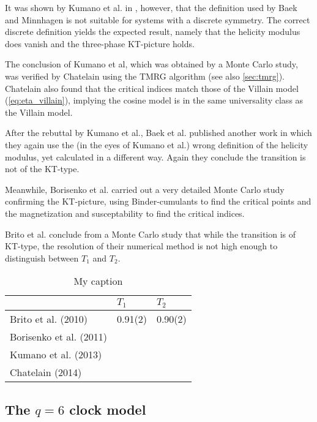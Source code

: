 It was shown by Kumano et al.
in \cite{kumano2013response}, however, that the definition used by Baek and Minnhagen is not suitable for systems with a
discrete symmetry.
The correct discrete definition yields the expected result, namely that the helicity modulus does vanish and the
three-phase KT-picture holds.

The conclusion of Kumano et al, which was obtained by a Monte Carlo study,
was verified by Chatelain \cite{chatelain2014dmrg} using the TMRG algorithm \cite{nishino1995density} (see also
\autoref{sec:tmrg}).
Chatelain also found that the critical indices match those of the Villain model (\autoref{eq:eta_villain}),
implying the cosine model is in the same universality class as the Villain model.

After the rebuttal by Kumano et al., Baek et al.
published another work \cite{baek2013residual} in which they again use the (in the eyes of Kumano et al.) wrong
definition of the helicity modulus, yet calculated in a different way.
Again they conclude the transition is not of the KT-type.

Meanwhile, Borisenko et al.
\cite{borisenko2011numerical} carried out a very detailed Monte Carlo study confirming the KT-picture,
using Binder-cumulants to find the critical points and the magnetization and susceptability to find the critical
indices.

Brito et al.
\cite{brito2010twodimensional} conclude from a Monte Carlo study that while the transition is of KT-type,
the resolution of their numerical method is not high enough to distinguish between $T_1$ and $T_2$.

\begin{table}[]
\centering
\begin{tabular}{@{}lll@{}}
\toprule
 & $T_1$ & $T_2$ \\ \midrule
Brito et al. (2010) & 0.91(2) & 0.90(2) \\
Borisenko et al. (2011) &  &  \\
Kumano et al. (2013) &  &  \\
Chatelain (2014) &  &  \\ \bottomrule
\end{tabular}
\caption{My caption}
\label{my-label}
\end{table}


\subsection{The $q = 6$ clock model}


